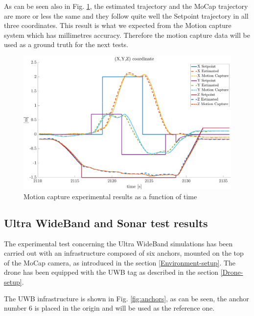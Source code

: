 \documentclass[journal]{IEEEtran}
\begin{document}
As can be seen also in Fig. \ref{fig:mocap_test_time}, the estimated trajectory and the MoCap trajectory are more or less the same and they follow quite well the Setpoint trajectory in all three coordinates. This result is what we expected from the Motion capture system which has millimetres accuracy. Therefore the motion capture data will be used as a ground truth for the next tests.  

\begin{figure}
    \centering
    \includegraphics[scale=0.2]{Images/square_trj/xyz_square1_time.png}
    \caption{Motion capture experimental results as a function of time}
    \label{fig:mocap_test_time}
\end{figure}

\subsection{Ultra WideBand and Sonar test results}

The experimental test concerning the Ultra WideBand simulations has been carried out with an infrastructure composed of six anchors, mounted on the top of the MoCap camera, as introduced in the section \ref{Environment-setup}. The drone has been equipped with the UWB tag as described in the section \ref{Drone-setup}.

The UWB infrastructure is shown in Fig. \ref{fig:anchors}, as can be seen, the anchor number 6 is placed in the origin and will be used as the reference one.
\end{document}

